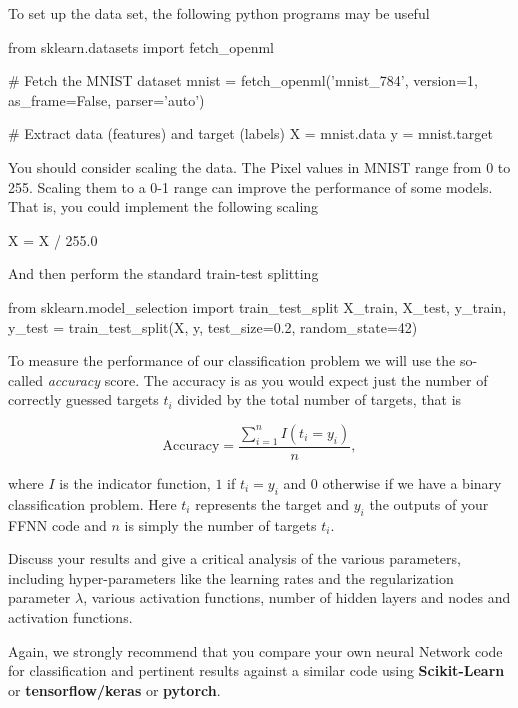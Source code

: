 \documentclass[%
oneside,                 %
final,                   %
10pt]{article}
\begin{document}
To set up the data set, the following python programs may be useful









\bpycod
from sklearn.datasets import fetch_openml

# Fetch the MNIST dataset
mnist = fetch_openml('mnist_784', version=1, as_frame=False, parser='auto')

# Extract data (features) and target (labels)
X = mnist.data
y = mnist.target

\epycod

You should consider scaling the data. The Pixel values in MNIST range from 0 to 255. Scaling them to a 0-1 range can improve the performance of some models. That is, you could implement the following scaling


\bpycod
X = X / 255.0

\epycod

And then perform the standard train-test splitting



\bpycod
from sklearn.model_selection import train_test_split
X_train, X_test, y_train, y_test = train_test_split(X, y, test_size=0.2, random_state=42)

\epycod


To measure the performance of our classification problem we will use the
so-called \emph{accuracy} score.  The accuracy is as you would expect just
the number of correctly guessed targets $t_i$ divided by the total
number of targets, that is 

\[ 
\text{Accuracy} = \frac{\sum_{i=1}^n I(t_i = y_i)}{n} ,
\]

where $I$ is the indicator function, $1$ if $t_i = y_i$ and $0$
otherwise if we have a binary classification problem. Here $t_i$
represents the target and $y_i$ the outputs of your FFNN code and $n$ is simply the number of targets $t_i$.

Discuss your results and give a critical analysis of the various parameters, including hyper-parameters like the learning rates and the regularization parameter $\lambda$, various activation functions, number of hidden layers and nodes and activation functions.  

Again, we strongly recommend that you compare your own neural Network
code for classification and pertinent results against a similar code using \textbf{Scikit-Learn}  or \textbf{tensorflow/keras} or \textbf{pytorch}.
\end{document}

